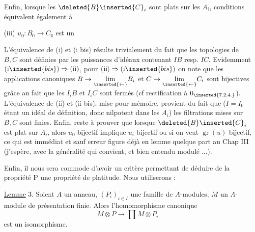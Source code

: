 Enfin, lorsque les $\deleted{B}\inserted{C}_i$ sont plats sur les $A_i$,  conditions équivalent également à

(iii) $u_0:B_0\to C_0$ est un  

L'équivalence de (i) et (i bis) résulte trivialement du fait que les topologies de $B,C$ sont  définies par les puissances d'idéaux contenant $IB$ resp. $IC$.  Evidemment $(\mathrm i\inserted{bis})\Rightarrow(\mathrm {ii})$, pour $(\mathrm {ii})\Rightarrow(\mathrm i\inserted{bis})$ on note que les applications canoniques $B\to\underset{\inserted{\leftarrow}}{\lim}B_i$ et $C\to\underset{\inserted{\leftarrow}}{\lim}C_i$ sont bijectives grâce au fait que les $I_iB$ et $I_iC$ sont fermés (cf rectification à $0_{\inserted{7.2.4.}}$). L'équivalence de (ii) et (ii bis),  mise pour mémoire, provient du fait que ($I=I_0$ étant un idéal de définition, donc nilpotent dans les $A_i$) les filtrations mises sur $B,C$ sont finies. Enfin, reste à prouver que lorsque  $\deleted{B}\inserted{C}_i$ est plat sur $A_i$, alors $u_0$ bijectif implique $u_i$ bijectif ou si on veut $\operatorname{gr}(u)$ bijectif, ce qui est immédiat et sauf erreur figure déjà en lemme quelque part au Chap III (j'espère, avec la généralité qui convient, et bien entendu modulé ...).




Enfin, il nous sera commode d'avoir un critère permettant de déduire
de la propriété P une propriété de platitude. Nous utiliserons :

\uline{Lemme} 3. Soient $A$ un anneau, $(P_i)_{i\in I}$ une famille de $A$-modules,
 $M$ un $A$-module de présentation finie. Alors l'homomorphisme canonique
\[
M\otimes P\longrightarrow\prod M\otimes P_i
\]
est un isomorphisme.

